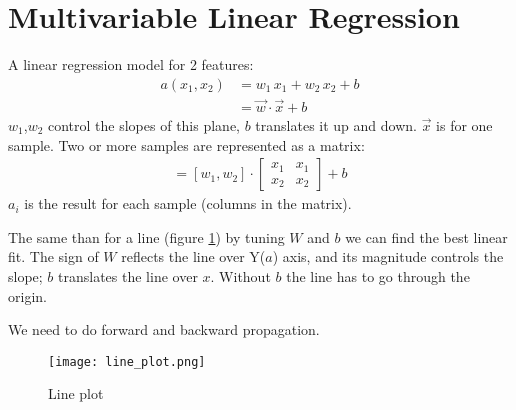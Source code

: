 \section{Multivariable Linear Regression}
A linear regression model for 2 features:
\begin{align*}
  a(x_1, x_2) &= w_1\,x_1 + w_2\,x_2 + b \\
   &= \vec{w}\cdot\vec{x} + b
\end{align*}
$w_1$,$w_2$ control the slopes of this plane, $b$ translates it up and down. $\vec{x}$ is for one sample. Two or more samples are represented as a matrix:
\begin{align*}
[a_1, a_2] = 
  [w_1, w_2]\cdot{}
  \begin{bmatrix}
  x_1 & x_1\\
  x_2 & x_2 
  \end{bmatrix}
 +  b
\end{align*}
$a_i$ is the result for each sample (columns in the matrix).

The same than for a line (figure \ref{fig:line}) by tuning $W$ and $b$  we can find the best linear fit. The sign of $W$ reflects the line over Y($a$) axis, and its magnitude controls the slope; $b$ translates the line over $x$. Without $b$ the line has to go through the origin. 

We need to do forward and backward propagation.
\begin{figure}[h]
 \centering
 \texttt{[image: line\_plot.png]}
  \caption{Line plot} \label{fig:line}
\end{figure}


